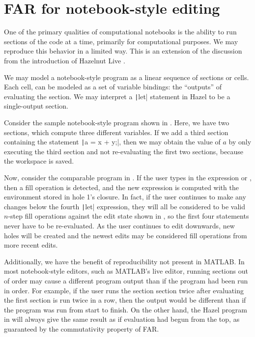 \section{FAR for notebook-style editing}
\label{sec:notebook-ui}

One of the primary qualities of computational notebooks is the ability to run sections of the code at a time, primarily for computational purposes. We may reproduce this behavior in a limited way. This is an extension of the discussion from the introduction of Hazelnut Live \cite{conf/popl/HazelnutLive19}.

We may model a notebook-style program as a linear sequence of sections or cells. Each cell, can be modeled as a set of variable bindings: the ``outputs'' of evaluating the section. We may interpret a \texttt|let| statement in Hazel to be a single-output section.

Consider the sample notebook-style program shown in . Here, we have two sections, which compute three different variables. If we add a third section containing the statement \texttt|a = x + y;|, then we may obtain the value of $a$ by only executing the third section and not re-evaluating the first two sections, because the workspace is saved.

Now, consider the comparable program in . If the user types in the expression  or , then a fill operation is detected, and the new expression is computed with the environment stored in hole 1's closure. In fact, if the user continues to make any changes below the fourth \texttt|let| expression, they will all be considered to be valid $n$-step fill operations against the edit state shown in , so the first four statements never have to be re-evaluated. As the user continues to edit downwards, new holes will be created and the newest edits may be considered fill operations from more recent edits.

Additionally, we have the benefit of reproducibility not present in MATLAB. In most notebook-style editors, such as MATLAB's live editor, running sections out of order may cause a different program output than if the program had been run in order. For example, if the user runs the section section twice after evaluating the first section  is run twice in a row, then the output would be different than if the program was run from start to finish. On the other hand, the Hazel program in  will always give the same result as if evaluation had begun from the top, as guaranteed by the commutativity property of FAR.

